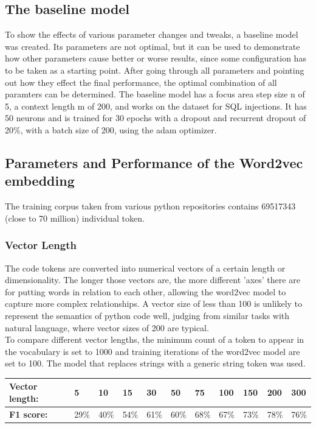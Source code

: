 \documentclass[
	a4paper,
	pagesize,
	pdftex,
	12pt,
	twoside, %
	BCOR=5mm, %
	ngerman,
	fleqn,
	final,
	]{scrartcl}
\begin{document}
\subsection{The baseline model}
To show the effects of various parameter changes and tweaks, a baseline model was created. Its parameters are not optimal, but it can be used to demonstrate how other parameters cause better or worse results, since some configuration has to be taken as a starting point. After going through all parameters and pointing out how they effect the final performance, the optimal combination of all paramters can be determined. The baseline model has a focus area step size n of 5, a context length m of 200, and works on the dataset for SQL injections. It has 50 neurons and is trained for 30 epochs with a dropout and recurrent dropout of 20\%, with a batch size of 200, using the adam optimizer. 

\subsection{Parameters and Performance of the Word2vec embedding}

The training corpus taken from various python repositories contains 69517343 (close to 70 million) individual token.

\subsubsection{Vector Length}
The code tokens are converted into numerical vectors of a certain length or dimensionality. The longer those vectors are, the more different 'axes' there are for putting words in relation to each other, allowing the word2vec model to capture more complex relationships. A vector size of less than 100 is unlikely to represent the semantics of python code well, judging from similar tasks with natural language, where vector sizes of 200 are typical.\\
To compare different vector lengths, the minimum count of a token to appear in the vocabulary is set to 1000 and training iterations of the word2vec model are set to 100. The model that replaces strings with a generic string token was used.



\begin{tabular}{| p{3.5cm}  | p{0.6cm} | p{0.6cm} | p{0.6cm} | p{0.6cm} | p{0.6cm} | p{0.6cm} | p{0.8cm} | p{0.8cm} | p{0.8cm} | p{0.8cm} | }
	\hline
	\textbf{Vector length:} & 5 & 10 & 15 & 30 & 50 & 75 & 100 & 150 & 200 & 300 \\
	\hline
	
	\textbf{F1 score:} & 29\% & 40\% & 54\% & 61\% & 60\% & 68\% & 67\% & 73\% & 78\% & 76\% \\
	\hline
	\hline
\end{tabular}
\end{document}
